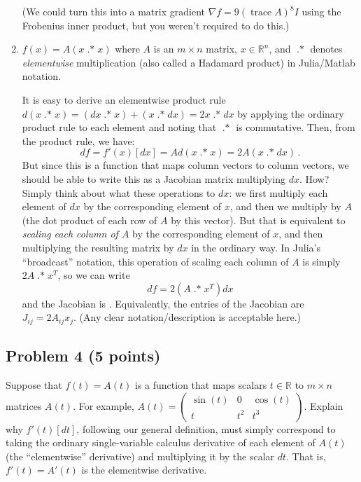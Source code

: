 \documentclass[10pt,oneside]{article}
\newcommand{\tr}{\operatorname{trace}}
\newcommand{\dotstar}{\operatorname{.*}}
\begin{document}
\begin{enumerate}
(We could turn this into a matrix gradient $\nabla f = 9 (\tr A)^8 I$ using the Frobenius inner product, but you weren't required to do this.)

\item $f(x) = A (x \dotstar x)$ where $A$ is an $m \times n$ matrix, $x \in \mathbb{R}^n$, and $\dotstar$ denotes \emph{elementwise} multiplication (also called a Hadamard product) in Julia/Matlab notation. 

It is easy to derive an elementwise product rule $d(x \dotstar x) = (dx \dotstar x) + (x \dotstar dx) =  2x \dotstar dx$ by applying the ordinary product rule to each element and noting that $\dotstar$ is commutative.  Then, from the product rule, we have:
$$
df = f'(x)[dx] = A d(x \dotstar x) = 2A (x \dotstar dx) \, . 
$$
But since this is a function that maps column vectors to column vectors, we should be able to write this as a Jacobian matrix multiplying $dx$.  How?  Simply think about what these operations to $dx$: we first multiply each element of $dx$ by the corresponding element of $x$, and then we multiply by $A$ (the dot product of each row of $A$ by this vector).  But that is equivalent to \emph{scaling each column of $A$} by the corresponding element of $x$, and then multiplying the resulting matrix by $dx$ in the ordinary way.  In Julia's ``broadcast'' notation, this operation of scaling each column of $A$ is simply $2A \dotstar x^T$, so we can write
$$
df = 2(A \dotstar x^T) dx
$$
and the Jacobian is \boxed{J = 2A \dotstar x^T}.  Equivalently, the entries of the Jacobian are $\boxed{J_{ij} = 2A_{ij} x_j}$.  (Any clear notation/description is acceptable here.)

\end{enumerate}
 
\subsection*{Problem 4 (5 points)}

Suppose that $f(t) = A(t)$ is a function that maps scalars $t \in \mathbb{R}$ to $m \times n$ matrices $A(t)$.  For example, $A(t) = \begin{pmatrix} \sin(t) & 0 & \cos(t) \\ t & t^2 & t^3 \end{pmatrix}$.   Explain why $f'(t)[dt]$, following our general definition, must simply correspond to taking the ordinary single-variable calculus derivative of each element of $A(t)$ (the ``elementwise'' derivative) and multiplying it by the scalar $dt$.  That is, $f'(t) = A'(t)$ is the elementwise derivative.
\end{document}
